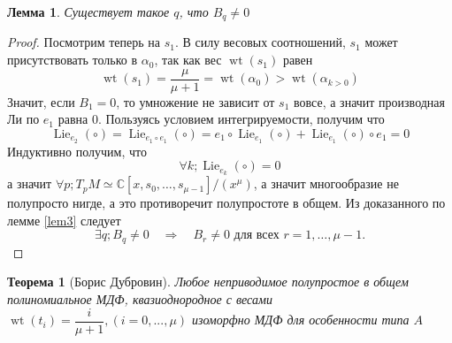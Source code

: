 \documentclass[a4paper, 10pt]{article}
\theoremstyle{plain}
\newtheorem{lem}{Лемма}
\newtheorem{theorem}{Теорема}
\begin{document}
\begin{lem} \label{lem4}
    Существует такое \(q\), что \(B_q \neq 0\)
\end{lem}
\begin{proof}
Посмотрим теперь на \(s_1\). В силу весовых соотношений, \(s_1\) может присутствовать только в \(\alpha_0\), так как вес \(\operatorname{wt}(s_1)\) равен 
\[\operatorname{wt}(s_{1}) = \dfrac{\mu}{\mu + 1} = \operatorname{wt}(\alpha_{0}) > \operatorname{wt}(\alpha_{k>0})\]
Значит, если \(B_1=0\), то умножение не зависит от \(s_1\) вовсе, а значит производная Ли по \(e_1\) равна 0. Пользуясь условием интегрируемости, получим что 
\[\operatorname{Lie}_{e_2}(\circ) = \operatorname{Lie}_{e_1\circ e_1}(\circ) = e_1 \circ \operatorname{Lie}_{e_1}(\circ) + \operatorname{Lie}_{e_1}(\circ) \circ e_1 = 0\]
Индуктивно получим, что \[\forall k; \operatorname{Lie}_{e_k}(\circ) = 0\]
а значит \(\forall p; T_pM \simeq \mathbb{C}\left[x, s_0, \dots, s_{\mu - 1}\right]/ (x^\mu)\), а значит многообразие не полупросто нигде, а это противоречит полупростоте в общем.
Из доказанного по лемме \ref{lem3} следует 
\[
\exists q; B_q\neq 0
\quad\Longrightarrow\quad
B_r\neq 0
\text{ для всех }r=1,\ldots,\mu-1.
\]
\end{proof}
\begin{theorem}[Борис Дубровин]
    Любое неприводимое полупростое в общем полиномиальное МДФ, квазиоднородное с весами  \(\operatorname{wt}(t_i) = \dfrac{i}{\mu+1}, (i = 0, . . . , \mu)\) изоморфно МДФ для особенности типа \(A\)
\end{theorem}
\end{document}

